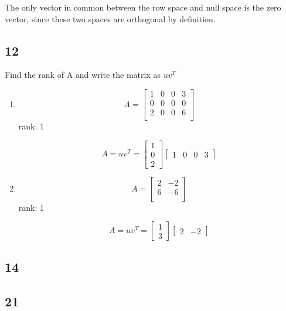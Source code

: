 \documentclass[12pt,letterpaper]{article}
\begin{document}
      The only vector in common between the row space and null space is the zero vector, since these two spaces are orthogonal by definition.
    \subsection*{12}
      Find the rank of A and write the matrix as $uv^T$

      \begin{enumerate}
        \item
          \[
            A = \begin{bmatrix}
              1 & 0 & 0 & 3 \\
              0 & 0 & 0 & 0 \\
              2 & 0 & 0 & 6 \\
            \end{bmatrix}
          \]
          rank: 1

          \[
            A = uv^T =
            \begin{bmatrix}
              1 \\
              0 \\
              2
            \end{bmatrix}
            \begin{bmatrix}
              1 & 0 & 0 & 3
            \end{bmatrix}
          \]

        \item
          \[
            A = \begin{bmatrix}
              2 & -2 \\
              6 & -6 \\
            \end{bmatrix}
          \]
          rank: 1

          \[
            A = uv^T =
            \begin{bmatrix}
              1 \\
              3
            \end{bmatrix}
            \begin{bmatrix}
              2 & -2
            \end{bmatrix}
          \]
      \end{enumerate}
    \subsection*{14}
    \subsection*{21}
\end{document}
